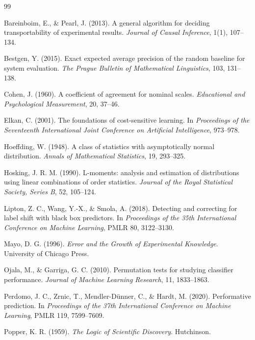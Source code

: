 \documentclass[11pt]{article}
\theoremstyle{remark}
\begin{document}
\begin{thebibliography}{99}

Bareinboim, E., \& Pearl, J. (2013).
A general algorithm for deciding transportability of experimental results.
\emph{Journal of Causal Inference}, 1(1), 107--134.

Bestgen, Y. (2015).
Exact expected average precision of the random baseline for system evaluation.
\emph{The Prague Bulletin of Mathematical Linguistics}, 103, 131--138.

Cohen, J. (1960).
A coefficient of agreement for nominal scales.
\emph{Educational and Psychological Measurement}, 20, 37--46.

Elkan, C. (2001).
The foundations of cost-sensitive learning.
In \emph{Proceedings of the Seventeenth International Joint Conference on Artificial Intelligence}, 973--978.

Hoeffding, W. (1948).
A class of statistics with asymptotically normal distribution.
\emph{Annals of Mathematical Statistics}, 19, 293--325.

Hosking, J. R. M. (1990).
L-moments: analysis and estimation of distributions using linear combinations of order statistics.
\emph{Journal of the Royal Statistical Society, Series B}, 52, 105--124.

Lipton, Z. C., Wang, Y.-X., \& Smola, A. (2018).
Detecting and correcting for label shift with black box predictors.
In \emph{Proceedings of the 35th International Conference on Machine Learning}, PMLR 80, 3122--3130.

Mayo, D. G. (1996).
\emph{Error and the Growth of Experimental Knowledge}.
University of Chicago Press.

Ojala, M., \& Garriga, G. C. (2010).
Permutation tests for studying classifier performance.
\emph{Journal of Machine Learning Research}, 11, 1833--1863.

Perdomo, J. C., Zrnic, T., Mendler-D\"unner, C., \& Hardt, M. (2020).
Performative prediction.
In \emph{Proceedings of the 37th International Conference on Machine Learning}, PMLR 119, 7599--7609.

Popper, K. R. (1959).
\emph{The Logic of Scientific Discovery}.
Hutchinson.


\end{thebibliography}
\end{document}
